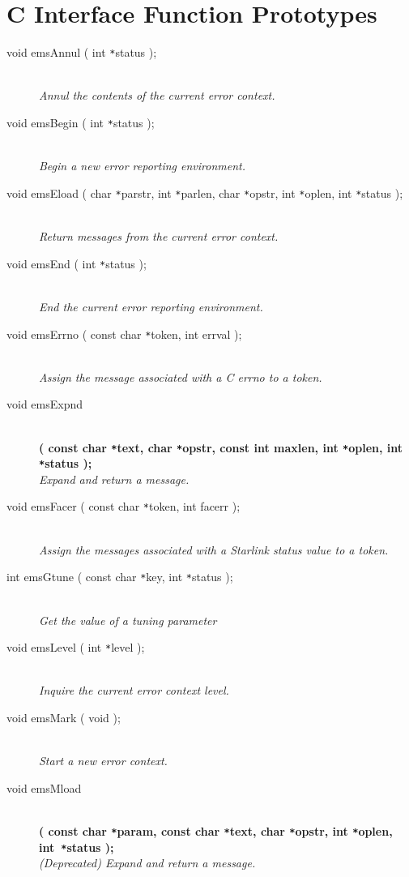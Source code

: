 \documentclass[twoside,11pt]{starlink}
\providecommand{\listline}{\hspace{1pt}\\}
\begin{document}
\section{C Interface Function
Prototypes} \label{C_sect}
\begin {description}

\item[void emsAnnul ( int \texttt{*}status );] \listline
\textit{Annul the contents of the current error context.}

\item[void emsBegin ( int \texttt{*}status );] \listline
\textit{Begin a new error reporting environment.}

\item[void emsEload
( char \texttt{*}parstr, int \texttt{*}parlen, char \texttt{*}opstr,
int \texttt{*}oplen, int \texttt{*}status );] \listline
\textit{Return messages from the current error context.}

\item[void emsEnd ( int \texttt{*}status );] \listline
\textit{End the current error reporting environment.}

\item[void emsErrno ( const char \texttt{*}token, int errval );] \listline
\textit{Assign the message associated with a C errno to a token.}

\item[void emsExpnd] \listline
\textbf{( const char \texttt{*}text, char \texttt{*}opstr,
const int maxlen, int \texttt{*}oplen, int \texttt{*}status );} \\
\textit{Expand and return a message.}

\item[void emsFacer ( const char \texttt{*}token, int facerr );] \listline
\textit{Assign the messages associated with a Starlink status value to a
token.}

\item[int emsGtune ( const char \texttt{*}key, int \texttt{*}status );]
\listline
\textit{Get the value of a tuning parameter}

\item[void emsLevel ( int \texttt{*}level );] \listline
\textit{Inquire the current error context level.}

\item[void emsMark ( void );] \listline
\textit{Start a new error context.}

\item[void emsMload] \listline
\textbf{( const char \texttt{*}param, const char \texttt{*}text,
char \texttt{*}opstr, int \texttt{*}oplen, int~\texttt{*}status );} \\
\textit{(Deprecated) Expand and return a message.}


\end{description}
\end{document}
